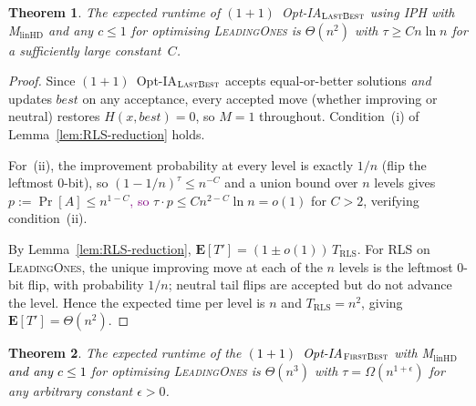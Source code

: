 \documentclass[lettersize,journal]{IEEEtran}
\newcommand{\new}[1]{\textcolor{black}{#1}}
\newcommand{\rerev}[1]{\textcolor{purple}{#1}}
\newcommand{\linHD}{M$_{\text{linHD}}$}
\newcommand{\IPHfcm}{IPH}
\newcommand{\lastBest}{$(1+1)$~Opt-IA$_{\textsc{LastBest}}$}
\newtheorem{theorem}{Theorem}
\begin{document}
\begin{theorem}\label{thm:LBleadingones}
The expected runtime of \lastBest{} using \IPHfcm{} with \linHD{} and any
$c\leq 1$ for optimising \textsc{LeadingOnes} is $\Theta(n^2)$ with
$\tau\geq Cn\ln n$ for a sufficiently large constant~$C$.
\end{theorem}
\begin{proof}
Since \lastBest{} accepts equal-or-better solutions \emph{and} updates
$\mathit{best}$ on any acceptance, every accepted move (whether improving or
neutral) restores $H(x,\mathit{best})=0$, so $M=1$ throughout.
Condition~(i) of Lemma~\ref{lem:RLS-reduction} holds.

For~(ii), the improvement probability at every level is exactly $1/n$
(flip the leftmost $0$-bit), so $(1-1/n)^\tau\leq n^{-C}$
and a union bound over $n$ levels gives $p:=\Pr[A]\leq n^{1-C}$\rerev{, so}
$\tau\cdot p\leq Cn^{2-C}\ln n=o(1)$ for $C>2$, verifying
condition~(ii).

By Lemma~\ref{lem:RLS-reduction},
$\mathbf{E}[T']=(1\pm o(1))\,T_{\mathrm{RLS}}$.
For RLS on \textsc{LeadingOnes}, the unique improving move at each of the $n$
levels is the leftmost $0$-bit flip, with probability $1/n$; neutral tail
flips are accepted but do not advance the level.  Hence the expected time per
level is $n$ and $T_{\mathrm{RLS}}=n^2$, giving $\mathbf{E}[T']=\Theta(n^2)$.
\end{proof}

\begin{theorem}\label{thm:FBleadingones}
The expected runtime of the \new{$(1+1)$~Opt-IA$_{\textsc{FirstBest}}$}  with {\linHD } \new{and any $c\leq 1$} for optimising
\textsc{LeadingOnes} is $\Theta(n^3)$ with $\tau=\Omega(n^{1+\epsilon})$ for any arbitrary
constant $\epsilon>0$.
\end{theorem}
\end{document}
